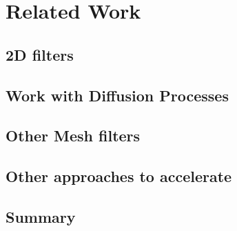 \chapter{Related Work}
%
\section{2D filters}



\section{Work with Diffusion Processes}



\section{Other Mesh filters}



\section{Other approaches to accelerate}



\section{Summary}
%
